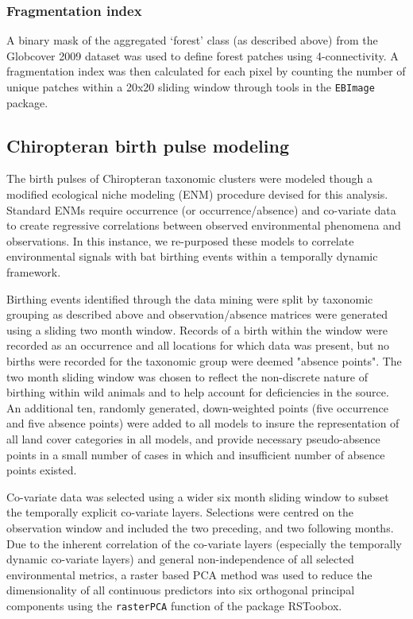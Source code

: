 \documentclass[9pt,twoside,lineno]{pnas-new}
\begin{document}
\subsubsection*{Fragmentation index}
A binary mask of the aggregated `forest' class (as described above) from the Globcover 2009 dataset \cite{Olivier2012Global2009} was used to define forest patches using 4-connectivity. A fragmentation index was then calculated for each pixel by counting the number of unique patches within a 20x20 sliding window through tools in the \texttt{EBImage} package. \par
\subsection*{Chiropteran birth pulse modeling}
\label{biomod}
The birth pulses of Chiropteran taxonomic clusters were modeled though a modified ecological niche modeling (ENM) procedure devised for this analysis. Standard ENMs require occurrence (or occurrence/absence) and co-variate data to create regressive correlations between observed environmental phenomena and observations. In this instance, we re-purposed these models to correlate environmental signals with bat birthing events within a temporally dynamic framework.\par
Birthing events identified through the data mining were split by taxonomic grouping as described above and observation/absence matrices were generated using a sliding two month window. Records of a birth within the window were recorded as an occurrence and all locations for which data was present, but no births were recorded for the taxonomic group were deemed "absence points". The two month sliding window was chosen to reflect the non-discrete nature of birthing within wild animals and to help account for deficiencies in the source. An additional ten, randomly generated, down-weighted points (five occurrence and five absence points) were added to all models to insure the representation of all land cover categories in all models, and provide necessary pseudo-absence points in a small number of cases in which and insufficient number of absence points existed.\par
Co-variate data was selected using a wider six month sliding window to subset the temporally explicit co-variate layers. Selections were centred on the observation window and included the two preceding, and two following months. Due to the inherent correlation of the co-variate layers (especially the temporally dynamic co-variate layers) and general non-independence of all selected environmental metrics, a raster based PCA method was used to reduce the dimensionality of all continuous predictors into six orthogonal principal components using the \texttt{rasterPCA} function of the package RSToobox.
\end{document}
